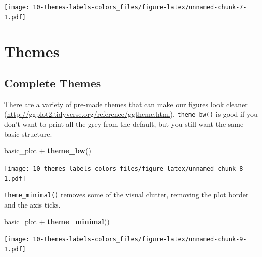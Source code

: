 \documentclass[]{book}
\newenvironment{Shaded}{\begin{snugshade}}{\end{snugshade}}
\newcommand{\KeywordTok}[1]{\textcolor[rgb]{0.13,0.29,0.53}{\textbf{{#1}}}}
\newcommand{\DataTypeTok}[1]{\textcolor[rgb]{0.13,0.29,0.53}{{#1}}}
\newcommand{\StringTok}[1]{\textcolor[rgb]{0.31,0.60,0.02}{{#1}}}
\newcommand{\NormalTok}[1]{{#1}}
\theoremstyle{definition}
\theoremstyle{definition}
\theoremstyle{remark}
\begin{document}
\begin{Shaded}
\end{Shaded}

\texttt{[image: 10-themes-labels-colors\_files/figure-latex/unnamed-chunk-7-1.pdf]}

\section{Themes}\label{themes}

\subsection{Complete Themes}\label{complete-themes}

There are a variety of pre-made themes that can make our figures look
cleaner (\url{http://ggplot2.tidyverse.org/reference/ggtheme.html}).
\texttt{theme\_bw()} is good if you don't want to print all the grey
from the default, but you still want the same basic structure.

\begin{Shaded}
\begin{Highlighting}[]
\NormalTok{basic_plot +}\StringTok{ }\KeywordTok{theme_bw}\NormalTok{()}
\end{Highlighting}
\end{Shaded}

\texttt{[image: 10-themes-labels-colors\_files/figure-latex/unnamed-chunk-8-1.pdf]}

\texttt{theme\_minimal()} removes some of the visual clutter, removing
the plot border and the axis ticks.

\begin{Shaded}
\begin{Highlighting}[]
\NormalTok{basic_plot +}\StringTok{ }\KeywordTok{theme_minimal}\NormalTok{()}
\end{Highlighting}
\end{Shaded}

\texttt{[image: 10-themes-labels-colors\_files/figure-latex/unnamed-chunk-9-1.pdf]}
\end{document}
